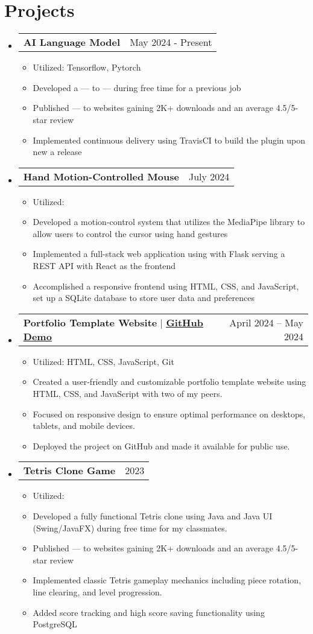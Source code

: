 \documentclass[letterpaper,11pt]{article}
\makeatletter
\newcommand{\resumeItem}[1]{
  \item\small{
    {#1 \vspace{-2pt}}
  }
}
\newcommand{\resumeProjectHeading}[2]{
    \item
    \begin{tabular*}{0.97\textwidth}{l@{\extracolsep{\fill}}r@{\hspace{-0.2in}}}
        \small#1 & #2 \\
    \end{tabular*}\vspace{-7pt}
}
\newcommand{\resumeSubHeadingListStart}{\begin{itemize}[leftmargin=0.00in, rightmargin=-0.2in, label={}]}
\newcommand{\resumeSubHeadingListEnd}{\end{itemize}}
\newcommand{\resumeItemListStart}{\begin{itemize}[leftmargin=0.15in]}
\newcommand{\resumeItemListEnd}{\end{itemize}\vspace{-5pt}}
\makeatother
\begin{document}
\section{Projects}
    \resumeSubHeadingListStart
        \resumeProjectHeading
            {\textbf{AI Language Model} {}}{May 2024 - Present}
            \resumeItemListStart
                \resumeItem{Utilized: Tensorflow, Pytorch}
                \resumeItem{Developed a --- to --- during free time for a previous job}
                \resumeItem{Published --- to websites gaining 2K+ downloads and an average 4.5/5-star review}
                \resumeItem{Implemented continuous delivery using TravisCI to build the plugin upon new a release}
            \resumeItemListEnd
        \resumeProjectHeading
            {\textbf{Hand Motion-Controlled Mouse} {}}{July 2024}
            \resumeItemListStart
                \resumeItem{Utilized: }
                \resumeItem{Developed a motion-control system that utilizes the MediaPipe library to allow users to control the cursor using hand gestures}
                \resumeItem{Implemented a full-stack web application using with Flask serving a REST API with React as the frontend}
                \resumeItem{Accomplished a responsive frontend using HTML, CSS, and JavaScript, set up a SQLite database to store user data and preferences}            \resumeItemListEnd
        \resumeProjectHeading
            {\textbf{Portfolio Template Website} $|$ \href{https://github.com/juhun32/portfolio-template-project}{\underline{\textbf{GitHub Demo}}}}{April 2024 -- May 2024}
            \resumeItemListStart
                \resumeItem{Utilized: HTML, CSS, JavaScript, Git}
                \resumeItem{Created a user-friendly and customizable portfolio template website using HTML, CSS, and JavaScript with two of my peers.}
                \resumeItem{Focused on responsive design to ensure optimal performance on desktops, tablets, and mobile devices.}
                \resumeItem{Deployed the project on GitHub and made it available for public use.}
            \resumeItemListEnd
        \resumeProjectHeading
            {\textbf{Tetris Clone Game} {}}{2023}
            \resumeItemListStart
                \resumeItem{Utilized: }
                \resumeItem{Developed a fully functional Tetris clone using Java and Java UI (Swing/JavaFX) during free time for my classmates.}
                \resumeItem{Published --- to websites gaining 2K+ downloads and an average 4.5/5-star review}
                \resumeItem{Implemented classic Tetris gameplay mechanics including piece rotation, line clearing, and level progression.}
                \resumeItem{Added score tracking and high score saving functionality using PostgreSQL}
            \resumeItemListEnd
    \resumeSubHeadingListEnd
\end{document}
